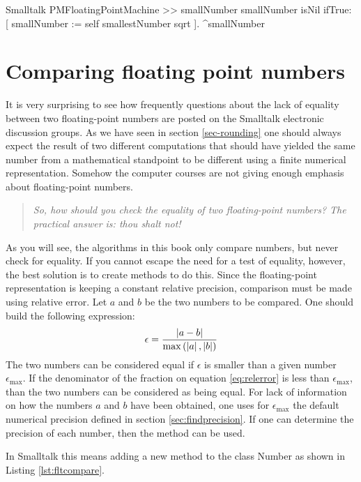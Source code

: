 \begin{displaycode}{Smalltalk}
PMFloatingPointMachine >> smallNumber
    smallNumber isNil
        ifTrue: [ smallNumber := self smallestNumber sqrt ].
    ^smallNumber
\end{displaycode}

\section{Comparing floating point numbers}
It is very surprising to see how frequently questions about the
lack of equality between two floating-point numbers are posted on
the Smalltalk electronic discussion groups.
As we have seen in section \ref{sec-rounding} one should always expect the
result of two different computations that should have yielded the
same number from a mathematical standpoint to be different using a
finite numerical representation.
Somehow the computer courses are not giving enough emphasis about floating-point numbers.
\begin{quote}
{\textsl{So, how should you check the equality of two floating-point numbers? The practical answer is: thou shalt not!}}
\end{quote}

As you will see, the algorithms in this book only compare numbers, but never check for equality.
If you cannot escape the need for a test of equality, however, the best solution
is to create methods to do this.
Since the floating-point representation is keeping a constant relative precision,
comparison must be made using relative error.
Let $a$ and $b$ be the two numbers to be compared.
One should build the following expression:
\begin{equation}
\label{eq:relerror}
\epsilon={\left|a-b\right| \over
\max\left(\left|a\right|,\left|b\right|\right)}
\end{equation}
The two numbers can be considered equal if $\epsilon$ is smaller
than a given number $\epsilon_{\max}$. If the denominator of the
fraction on equation \ref{eq:relerror} is less than
$\epsilon_{\max}$, than the two numbers can be considered as being
equal. For lack of information on how the numbers $a$ and $b$ have
been obtained, one uses for $\epsilon_{\max}$ the default
numerical precision defined in section \ref{sec:findprecision}.
If one can determine the precision of each number, then the method  can be used.

In Smalltalk this means adding a new method to the class Number as
shown in Listing \ref{lst:fltcompare}.

